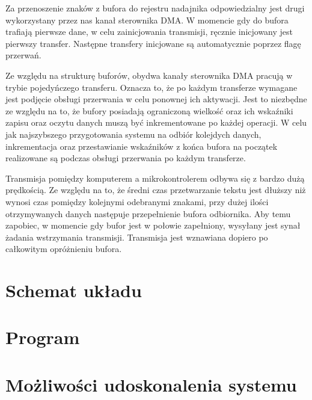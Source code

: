 \documentclass[fleqn]{article}
\begin{document}
Za przenoszenie znaków z bufora do rejestru nadajnika odpowiedzialny jest drugi wykorzystany przez nas kanał sterownika DMA. W momencie gdy do bufora trafiają pierwsze dane, w celu zainicjowania transmisji, ręcznie inicjowany jest pierwszy transfer. Następne transfery inicjowane są automatycznie poprzez flagę przerwań.

Ze względu na strukturę buforów, obydwa kanały sterownika DMA pracują w trybie pojedyńczego transferu. Oznacza to, że po każdym transferze wymagane jest podjęcie obsługi przerwania w celu ponownej ich aktywacji. Jest to niezbędne ze względu na to, że bufory posiadają ograniczoną wielkość oraz ich wskaźniki zapisu oraz oczytu danych muszą być inkrementowane po każdej operacji. W celu jak najszybszego przygotowania systemu na odbiór kolejdych danych, inkrementacja oraz przestawianie wskaźników z końca bufora na początek realizowane są podczas obsługi przerwania po każdym transferze.

Transmisja pomiędzy komputerem a mikrokontrolerem odbywa się z bardzo dużą prędkością. Ze względu na to, że średni czas przetwarzanie tekstu jest dłuższy niż wynosi czas pomiędzy kolejnymi odebranymi znakami, przy dużej ilości otrzymywanych danych następuje przepełnienie bufora odbiornika. Aby temu zapobiec, w momencie gdy bufor jest w połowie zapełniony, wysyłany jest synał żadania wstrzymania transmisji. Transmisja jest wznawiana dopiero po całkowitym opróżnieniu bufora.




\pagebreak
\section{Schemat układu}



\pagebreak
 \section{Program}




\pagebreak
\section{Możliwości udoskonalenia systemu}
\end{document}
